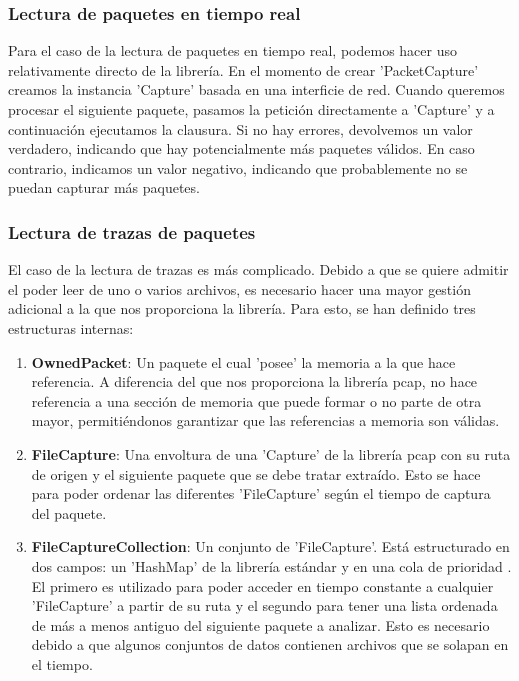 \subsubsection{Lectura de paquetes en tiempo real}

Para el caso de la lectura de paquetes en tiempo real, podemos hacer uso relativamente directo de la librería. En el momento de crear 'PacketCapture' creamos la instancia 'Capture' basada en una interficie de red. Cuando queremos procesar el siguiente paquete, pasamos la petición directamente a 'Capture' y a continuación ejecutamos la clausura. Si no hay errores, devolvemos un valor verdadero, indicando que hay potencialmente más paquetes válidos. En caso contrario, indicamos un valor negativo, indicando que probablemente no se puedan capturar más paquetes.

\subsubsection{Lectura de trazas de paquetes}

El caso de la lectura de trazas es más complicado. Debido a que se quiere admitir el poder leer de uno o varios archivos, es necesario hacer una mayor gestión adicional a la que nos proporciona la librería. Para esto, se han definido tres estructuras internas:
\begin{enumerate}
  \item \textbf{OwnedPacket}: Un paquete el cual 'posee' la memoria a la que hace referencia. A diferencia del que nos proporciona la librería pcap, no hace referencia a una sección de memoria que puede formar o no parte de otra mayor, permitiéndonos garantizar que las referencias a memoria son válidas.
  \item \textbf{FileCapture}: Una envoltura de una 'Capture' de la librería pcap con su ruta de origen y el siguiente paquete que se debe tratar extraído. Esto se hace para poder ordenar las diferentes 'FileCapture' según el tiempo de captura del paquete.
  \item \textbf{FileCaptureCollection}: Un conjunto de 'FileCapture'. Está estructurado en dos campos: un 'HashMap' de la librería estándar y en una cola de prioridad \cite{priority-queue}. El primero es utilizado para poder acceder en tiempo constante a cualquier 'FileCapture' a partir de su ruta y el segundo para tener una lista ordenada de más a menos antiguo del siguiente paquete a analizar. Esto es necesario debido a que algunos conjuntos de datos contienen archivos que se solapan en el tiempo.
\end{enumerate}

